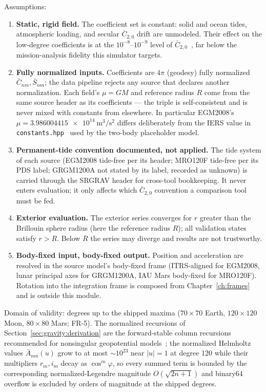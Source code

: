 Assumptions:
\begin{enumerate}
  \item \textbf{Static, rigid field.} The coefficient set is constant:
    solid and ocean tides, atmospheric loading, and secular
    $\bar{C}_{2,0}$ drift are unmodeled. Their effect on the low-degree
    coefficients is at the $10^{-8}$--$10^{-9}$ level of
    $\bar{C}_{2,0}$~\cite{pavlis2012}, far below the mission-analysis
    fidelity this simulator targets.
  \item \textbf{Fully normalized inputs.} Coefficients are $4\pi$
    (geodesy) fully normalized $\bar{C}_{nm}, \bar{S}_{nm}$; the data
    pipeline rejects any source that declares another normalization.
    Each field's $\mu = GM$ and reference radius $R$ come from the same
    source header as its coefficients --- the triple is self-consistent
    and is never mixed with constants from elsewhere. In particular
    EGM2008's $\mu = \qty{3.986004415e14}{\metre\cubed\per\second\squared}$
    differs deliberately from the IERS value in
    \texttt{constants.hpp}~\cite{iers2010} used by the two-body
    placeholder model.
  \item \textbf{Permanent-tide convention documented, not applied.} The
    tide system of each source (EGM2008 tide-free per its header;
    MRO120F tide-free per its PDS label; GRGM1200A not stated by its
    label, recorded as unknown) is carried through the SRGRAV header for
    cross-tool bookkeeping. It never enters evaluation; it only affects
    which $\bar{C}_{2,0}$ convention a comparison tool must be fed.
  \item \textbf{Exterior evaluation.} The exterior series converges for
    $r$ greater than the Brillouin sphere radius (here the reference
    radius $R$); all validation states satisfy $r > R$. Below $R$ the
    series may diverge and results are not trustworthy.
  \item \textbf{Body-fixed input, body-fixed output.} Position and
    acceleration are resolved in the source model's body-fixed frame
    (ITRS-aligned for EGM2008, lunar principal axes for GRGM1200A, IAU
    Mars body-fixed for MRO120F). Rotation into the integration frame is
    composed from Chapter~\ref{ch:frames} and is outside this module.
\end{enumerate}

Domain of validity: degrees up to the shipped maxima ($70\times70$
Earth, $120\times120$ Moon, $80\times80$ Mars; FR-5). The normalized
recursions of Section~\ref{sec:gravity:derivation} are the
forward-stable column recursions recommended for nonsingular
geopotential models~\cite{lundberg1988}; the normalized Helmholtz values
$\bar{A}_{nm}(u)$ grow to at most $\sim 10^{23}$ near $|u| = 1$ at
degree 120 while their multipliers $r_m, i_m$ decay as
$\cos^m\varphi$, so every summed term is bounded by the corresponding
normalized-Legendre magnitude $O(\sqrt{2n+1})$ and binary64 overflow is
excluded by orders of magnitude at the shipped degrees.

